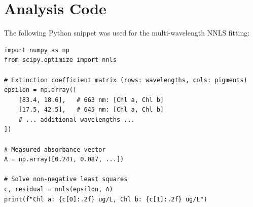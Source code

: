 \documentclass[
    language=english,
    doctype=article,
    institution=none,
    titlestyle=book,
]{../../omnilatex}
\begin{document}
\section{Analysis Code}
\label{app:code}

The following Python snippet was used for the multi-wavelength NNLS fitting:

\begin{verbatim}
import numpy as np
from scipy.optimize import nnls

# Extinction coefficient matrix (rows: wavelengths, cols: pigments)
epsilon = np.array([
    [83.4, 18.6],   # 663 nm: [Chl a, Chl b]
    [17.5, 42.5],   # 645 nm: [Chl a, Chl b]
    # ... additional wavelengths ...
])

# Measured absorbance vector
A = np.array([0.241, 0.087, ...])

# Solve non-negative least squares
c, residual = nnls(epsilon, A)
print(f"Chl a: {c[0]:.2f} ug/L, Chl b: {c[1]:.2f} ug/L")
\end{verbatim}

\printbibliography
\end{document}
